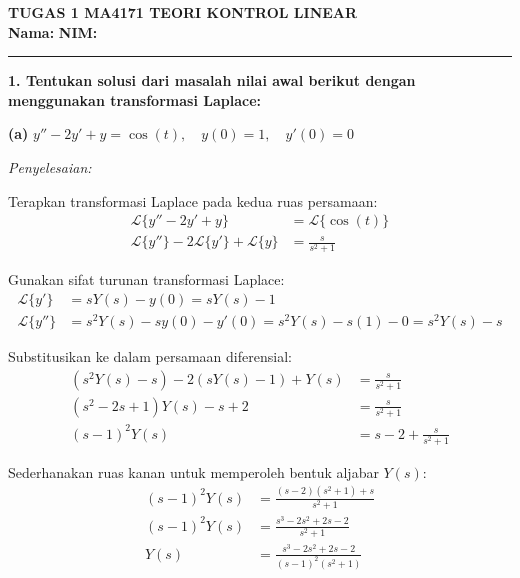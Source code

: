 \documentclass[11pt,a4paper]{article}
\begin{document}
\begin{center}
    {\large \textbf{TUGAS 1 MA4171 TEORI KONTROL LINEAR}}\\[4pt]
    \textbf{Nama:} \underline{\hspace{5cm}} \qquad \textbf{NIM:} \underline{\hspace{3.5cm}}
\end{center}
\vspace{-4pt}
\hrule
\vspace{12pt}

\setcounter{equation}{0}
\noindent \textbf{1. Tentukan solusi dari masalah nilai awal berikut dengan menggunakan transformasi Laplace:}

\vspace{6pt}
\setcounter{equation}{0}
\noindent \textbf{(a)} $y'' - 2y' + y = \cos(t), \quad y(0) = 1, \quad y'(0) = 0$

\vspace{2pt}
\noindent \textit{Penyelesaian:}

Terapkan transformasi Laplace pada kedua ruas persamaan:
\begin{align*}
    \mathcal{L}\{y'' - 2y' + y\} &= \mathcal{L}\{\cos(t)\} \\
    \mathcal{L}\{y''\} - 2\mathcal{L}\{y'\} + \mathcal{L}\{y\} &= \frac{s}{s^2 + 1}
\end{align*}

Gunakan sifat turunan transformasi Laplace:
\begin{align*}
    \mathcal{L}\{y'\} &= sY(s) - y(0) = sY(s) - 1 \\
    \mathcal{L}\{y''\} &= s^2Y(s) - sy(0) - y'(0) = s^2Y(s) - s(1) - 0 = s^2Y(s) - s
\end{align*}

Substitusikan ke dalam persamaan diferensial:
\begin{align*}
    (s^2Y(s) - s) - 2(sY(s) - 1) + Y(s) &= \frac{s}{s^2 + 1} \\
    (s^2 - 2s + 1)Y(s) - s + 2 &= \frac{s}{s^2 + 1} \\
    (s - 1)^2 Y(s) &= s - 2 + \frac{s}{s^2 + 1}
\end{align*}

Sederhanakan ruas kanan untuk memperoleh bentuk aljabar $Y(s)$:
\begin{align*}
    (s - 1)^2 Y(s) &= \frac{(s - 2)(s^2 + 1) + s}{s^2 + 1} \\
    (s - 1)^2 Y(s) &= \frac{s^3 - 2s^2 + 2s - 2}{s^2 + 1} \\
    Y(s) &= \frac{s^3 - 2s^2 + 2s - 2}{(s - 1)^2(s^2 + 1)}
\end{align*}
\end{document}
